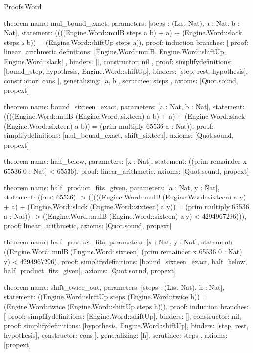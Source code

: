 \begin{lexlean}{Proofs.Word}
\begin{semanticmodule}
theorem{
  name: mul_bound_exact,
  parameters: [steps : (List Nat), a : Nat, b : Nat],
  statement: ((((Engine.Word::mulB steps a b) + a) + (Engine.Word::slack steps a b)) = (Engine.Word::shiftUp steps a)),
  proof: induction{
    branches: [
      {
        proof: linear_arithmetic{
          definitions: [Engine.Word::mulB, Engine.Word::shiftUp, Engine.Word::slack]
        },
        binders: [],
        constructor: nil
      },
      {
        proof: simplify{definitions: [bound_step, hypothesis, Engine.Word::shiftUp]},
        binders: [step, rest, hypothesis],
        constructor: cons
      }
    ],
    generalizing: [a, b],
    scrutinee: steps
  },
  axioms: [Quot.sound, propext]
}

theorem{
  name: bound_sixteen_exact,
  parameters: [a : Nat, b : Nat],
  statement: ((((Engine.Word::mulB (Engine.Word::sixteen) a b) + a) + (Engine.Word::slack (Engine.Word::sixteen) a b)) = (prim multiply 65536 a : Nat)),
  proof: simplify{definitions: [mul_bound_exact, shift_sixteen]},
  axioms: [Quot.sound, propext]
}

theorem{
  name: half_below,
  parameters: [x : Nat],
  statement: ((prim remainder x 65536 0 : Nat) < 65536),
  proof: linear_arithmetic{},
  axioms: [Quot.sound, propext]
}

theorem{
  name: half_product_fits_given,
  parameters: [a : Nat, y : Nat],
  statement: ((a < 65536) -> (((((Engine.Word::mulB (Engine.Word::sixteen) a y) + a) + (Engine.Word::slack (Engine.Word::sixteen) a y)) = (prim multiply 65536 a : Nat)) -> ((Engine.Word::mulB (Engine.Word::sixteen) a y) < 4294967296))),
  proof: linear_arithmetic{},
  axioms: [Quot.sound, propext]
}

theorem{
  name: half_product_fits,
  parameters: [x : Nat, y : Nat],
  statement: ((Engine.Word::mulB (Engine.Word::sixteen) (prim remainder x 65536 0 : Nat) y) < 4294967296),
  proof: simplify{definitions: [bound_sixteen_exact, half_below, half_product_fits_given]},
  axioms: [Quot.sound, propext]
}

theorem{
  name: shift_twice_out,
  parameters: [steps : (List Nat), h : Nat],
  statement: ((Engine.Word::shiftUp steps (Engine.Word::twice h)) = (Engine.Word::twice (Engine.Word::shiftUp steps h))),
  proof: induction{
    branches: [
      {proof: simplify{definitions: [Engine.Word::shiftUp]}, binders: [], constructor: nil},
      {
        proof: simplify{definitions: [hypothesis, Engine.Word::shiftUp]},
        binders: [step, rest, hypothesis],
        constructor: cons
      }
    ],
    generalizing: [h],
    scrutinee: steps
  },
  axioms: [propext]
}


\end{semanticmodule}
\end{lexlean}
